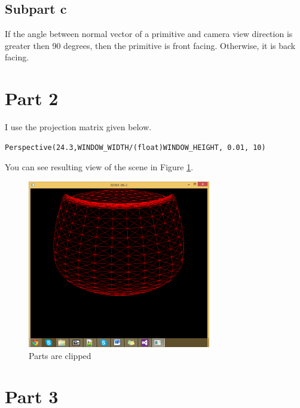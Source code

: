 \subsection{Subpart c}
\label{subsec:del-1-c}

If the angle between normal vector of a primitive and camera view direction is greater then 90 degrees, then the primitive is front facing. Otherwise, it is back facing.


\section{Part 2}
\label{sec:del-2-1}

I use the projection matrix given below.\\
\begin{lstlisting}
Perspective(24.3,WINDOW_WIDTH/(float)WINDOW_HEIGHT, 0.01, 10)
\end{lstlisting}

\smallskip
You can see resulting view of the scene in Figure \ref{fig:6-2}.

\begin{figure}[hp]
\centering
\includegraphics[width=8cm]{../Screenshots/ex-6/2.png}
\caption{Parts are clipped}
\label{fig:6-2}
\end{figure}

\section{Part 3}
\label{sec:del-3-1}



